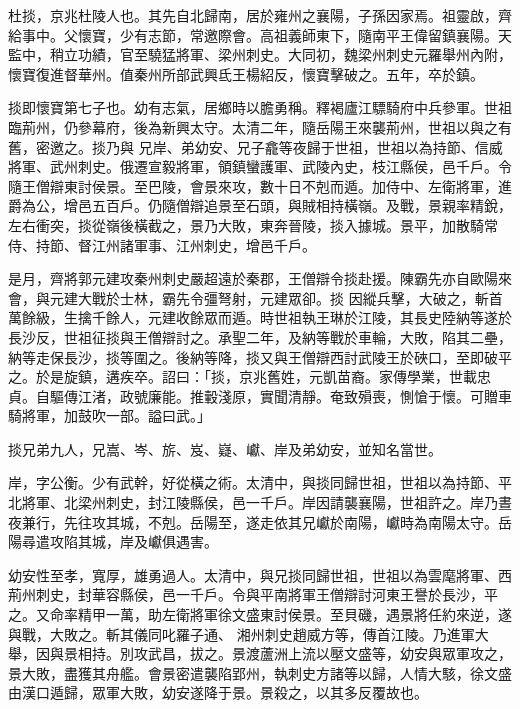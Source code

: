 \begin{pinyinscope}
 杜掞，京兆杜陵人也。其先自北歸南，居於雍州之襄陽，子孫因家焉。祖靈啟，齊給事中。父懷寶，少有志節，常邀際會。高祖義師東下，隨南平王偉留鎮襄陽。天監中，稍立功績，官至驍猛將軍、梁州刺史。大同初，魏梁州刺史元羅舉州內附，懷寶復進督華州。值秦州所部武興氐王楊紹反，懷寶擊破之。五年，卒於鎮。



 掞即懷寶第七子也。幼有志氣，居鄉時以膽勇稱。釋褐廬江驃騎府中兵參軍。世祖臨荊州，仍參幕府，後為新興太守。太清二年，隨岳陽王來襲荊州，世祖以與之有舊，密邀之。掞乃與
 兄岸、弟幼安、兄子龕等夜歸于世祖，世祖以為持節、信威將軍、武州刺史。俄遷宣毅將軍，領鎮蠻護軍、武陵內史，枝江縣侯，邑千戶。令隨王僧辯東討侯景。至巴陵，會景來攻，數十日不剋而遁。加侍中、左衛將軍，進爵為公，增邑五百戶。仍隨僧辯追景至石頭，與賊相持橫嶺。及戰，景親率精銳，左右衝突，掞從嶺後橫截之，景乃大敗，東奔晉陵，掞入據城。景平，加散騎常侍、持節、督江州諸軍事、江州刺史，增邑千戶。



 是月，齊將郭元建攻秦州刺史嚴超遠於秦郡，王僧辯令掞赴援。陳霸先亦自歐陽來會，與元建大戰於士林，霸先令彊弩射，元建眾卻。掞
 因縱兵擊，大破之，斬首萬餘級，生擒千餘人，元建收餘眾而遁。時世祖執王琳於江陵，其長史陸納等遂於長沙反，世祖征掞與王僧辯討之。承聖二年，及納等戰於車輪，大敗，陷其二壘，納等走保長沙，掞等圍之。後納等降，掞又與王僧辯西討武陵王於硤口，至即破平之。於是旋鎮，遘疾卒。詔曰：「掞，京兆舊姓，元凱苗裔。家傳學業，世載忠貞。自驅傳江渚，政號廉能。推轂淺原，實聞清靜。奄致殞喪，惻愴于懷。可贈車騎將軍，加鼓吹一部。謚曰武。」



 掞兄弟九人，兄嵩、岑、旂、岌、嶷、巘、岸及弟幼安，並知名當世。



 岸，字公衡。少有武幹，好從橫之術。太清中，與掞同歸世祖，世祖以為持節、平北將軍、北梁州刺史，封江陵縣侯，邑一千戶。岸因請襲襄陽，世祖許之。岸乃晝夜兼行，先往攻其城，不剋。岳陽至，遂走依其兄巘於南陽，巘時為南陽太守。岳陽尋遣攻陷其城，岸及巘俱遇害。



 幼安性至孝，寬厚，雄勇過人。太清中，與兄掞同歸世祖，世祖以為雲麾將軍、西荊州刺史，封華容縣侯，邑一千戶。令與平南將軍王僧辯討河東王譽於長沙，平之。又命率精甲一萬，助左衛將軍徐文盛東討侯景。至貝磯，遇景將任約來逆，遂與戰，大敗之。斬其儀同叱羅子通、
 湘州刺史趙威方等，傳首江陵。乃進軍大舉，因與景相持。別攻武昌，拔之。景渡蘆洲上流以壓文盛等，幼安與眾軍攻之，景大敗，盡獲其舟艦。會景密遣襲陷郢州，執刺史方諸等以歸，人情大駭，徐文盛由漢口遁歸，眾軍大敗，幼安遂降于景。景殺之，以其多反覆故也。




\end{pinyinscope}
